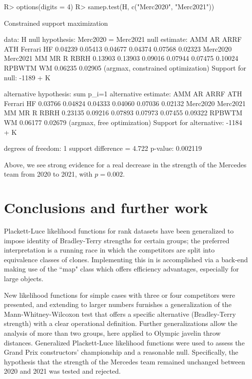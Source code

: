 \documentclass[article]{jss}
\begin{document}
\begin{Schunk}
\begin{Sinput}
R> options(digits = 4)
R> samep.test(H, c("Merc2020", "Merc2021"))
\end{Sinput}
\begin{Soutput}
	Constrained support maximization

data:  H
null hypothesis: Merc2020 = Merc2021
null estimate:
     AMM       AR     ARRF      ATH  Ferrari       HF 
 0.04239  0.05413  0.04677  0.04374  0.07568  0.02323 
Merc2020 Merc2021       MM       MR        R     RBRH 
 0.13903  0.13903  0.09016  0.07944  0.07475  0.10024 
  RPBWTM       WM 
 0.06235  0.02905 
(argmax, constrained optimization)
Support for null:  -1189 + K

alternative hypothesis:  sum p_i=1 
alternative estimate:
     AMM       AR     ARRF      ATH  Ferrari       HF 
 0.03766  0.04824  0.04333  0.04060  0.07036  0.02132 
Merc2020 Merc2021       MM       MR        R     RBRH 
 0.23135  0.09216  0.07893  0.07973  0.07455  0.09322 
  RPBWTM       WM 
 0.06177  0.02679 
(argmax, free optimization)
Support for alternative:  -1184 + K

degrees of freedom: 1
support difference = 4.722
p-value: 0.002119 
\end{Soutput}
\end{Schunk}

Above, we see strong evidence for a real decrease in the strength of
the Mercedes team from 2020 to 2021, with $p=0.002$.

\section{Conclusions and further work}

Plackett-Luce likelihood functions for rank datasets have been
generalized to impose identity of Bradley-Terry strengths for certain
groups; the preferred interpretation is a running race in which the
competitors are split into equivalence classes of clones.
Implementing this in  is accomplished via a 
back-end making use of the  ``map" class which offers
efficiency advantages, especially for large objects. 

New likelihood functions for simple cases with three or four
competitors were presented, and extending to larger numbers furnishes
a generalization of the Mann-Whitney-Wilcoxon test that offers a
specific alternative (Bradley-Terry strength) with a clear operational
definition.  Further generalizations allow the analysis of more than
two groups, here applied to Olympic javelin throw distances.
Generalized Plackett-Luce likelihood functions were used to assess the
Grand Prix constructors' championship and a reasonable null.
Specifically, the hypothesis that the strength of the Mercedes team
remained unchanged between 2020 and 2021 was tested and rejected.
\end{document}
